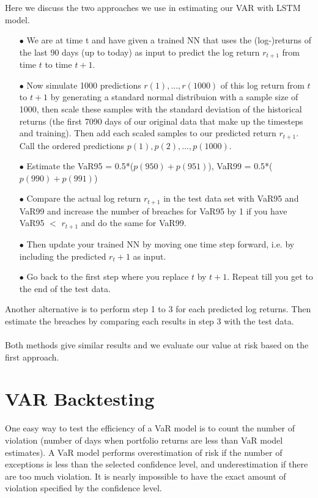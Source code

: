 \documentclass[a4paper,11pt,oneside]{book}
\begin{document}
Here we discuss the two approaches we use in estimating our VAR with LSTM model. 
\begin{itemize}
	
\item[$\bullet$]   We are at time t and have given a trained NN that uses the (log-)returns of the last 90 days (up to
today) as input to predict the log return $r_{t+1}$ from time $t$ to time $t+1$.
\item[$\bullet$]      Now simulate 1000 predictions $r(1), ..., r(1000)$ of this log return from $t$ to $t+1$ by generating a standard normal distribuion with a sample size of 1000, then scale these samples with the standard deviation of the historical returns (the first 7090 days of our original data that make up the timesteps and training). Then add each scaled samples to  our predicted return $r_{t+1}$. Call the ordered
predictions $p(1),p(2),...,p(1000)$.

\item[$\bullet$] Estimate the VaR95 = 0.5*($p(950)+p(951)$), VaR99 = 0.5*($p(990)+p(991)$)


\item[$\bullet$] Compare the actual log return $r_{t+1}$ in the test data set with VaR95 and VaR99 and increase the number
of breaches for VaR95 by 1 if you have VaR95 $<$ $r_{t+1}$ and do the same for VaR99.

\item[$\bullet$] Then update your trained NN by moving one time step forward, i.e. by including the predicted $r_t+1$ as input.
\item[$\bullet$] Go back to the first step where you replace $t$ by $t+1$. Repeat till you get to the end of the test data.

\end{itemize}

Another alternative is to perform step 1 to 3 for each predicted log returns. Then estimate the breaches by comparing each results in step 3 with the test data.\\\\

Both methods give similar results  and we evaluate our value at risk based on the first approach.

\section{VAR Backtesting}
One easy way to test the efficiency of a VaR model is to count the number of violation (number of days when portfolio returns are less than VaR model estimates). A VaR model performs overestimation of risk if the number of exceptions is less than the selected confidence level, and underestimation if there are too much violation. It is nearly impossible to have the exact amount of violation specified by the confidence level.\newline\newline
\end{document}
